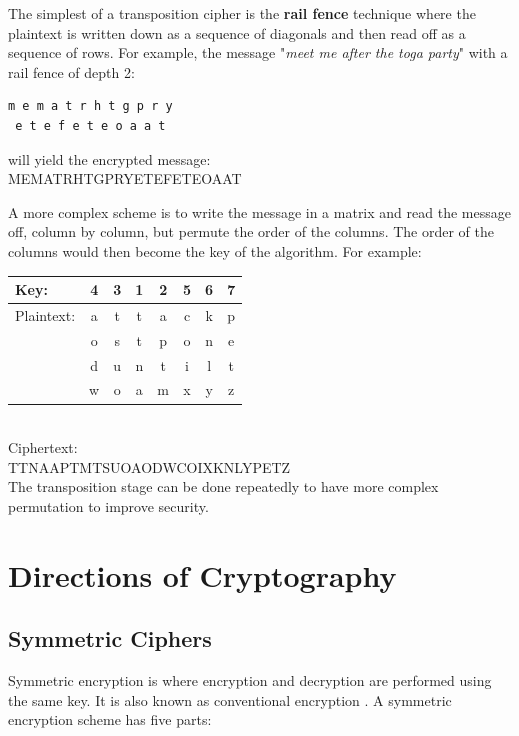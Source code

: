 \documentclass{article}
\begin{document}
The simplest of a transposition cipher is the \textbf{rail fence} technique where the plaintext is written down as a sequence of diagonals and then read off as a sequence of rows. For example, the message "\textit{meet me after the toga party}" with a rail fence of depth 2:
\\
\begin{verbatim}
m e m a t r h t g p r y
 e t e f e t e o a a t
\end{verbatim}
will yield the encrypted message:\\
MEMATRHTGPRYETEFETEOAAT

A more complex scheme is to write the message in a matrix and read the message off, column by column, but permute the order of the columns. The order of the columns would then become the key of the algorithm. For example:
\\

\begin{tabular}{l | *{7}{c}}
Key: & 4 & 3 & 1 & 2 & 5 & 6 & 7\\
\hline
Plaintext: & a & t & t & a & c & k & p\\
& o & s & t & p & o & n & e\\
& d & u & n & t & i & l & t\\
& w & o & a & m & x & y & z\\
\end{tabular}
\\

Ciphertext:\\
TTNAAPTMTSUOAODWCOIXKNLYPETZ
\\

The transposition stage can be done repeatedly to have more complex permutation to improve security.

\section{Directions of Cryptography}
\subsection{Symmetric Ciphers}
Symmetric encryption is  where encryption and decryption are performed using the same key. It is also known as conventional encryption \cite{stallings2011}. A symmetric encryption scheme has five parts:
\end{document}
